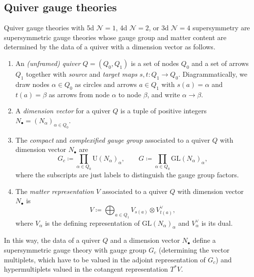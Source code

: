 \subsection{Quiver gauge theories}

Quiver gauge theories with 5d $\mathcal{N}=1$, 4d $\mathcal{N}=2$, or 3d $\mathcal{N}=4$ supersymmetry are supersymmetric gauge theories whose gauge group and matter content are determined by the data of a quiver with a dimension vector as follows.

\begin{definition}
	\begin{enumerate}[label=(\roman*)]
		\item An \emph{(unframed) quiver} $Q = (Q_0,Q_1)$ is a set of nodes $Q_0$ and a set of arrows $Q_1$ together with \emph{source} and \emph{target maps} $s,t\colon Q_1 \to Q_0$. Diagrammatically, we draw nodes $\alpha \in Q_0$ as circles and arrows $a \in Q_1$ with $s(a) = \alpha$ and $t(a) = \beta$ as arrows from node $\alpha$ to node $\beta$, and write $\alpha \to \beta$.
		\item A \emph{dimension vector} for a quiver $Q$ is a tuple of positive integers $N_\bullet = (N_\alpha)_{\alpha \in Q_0}$.
		\item The \emph{compact} and \emph{complexified gauge group} associated to a quiver $Q$ with dimension vector $N_\bullet$ are
		\begin{equation}
			G_c \coloneq \prod_{\alpha \in Q_0} \mathrm{U}(N_\alpha)_\alpha, \qquad G \coloneq \prod_{\alpha \in Q_0} \mathrm{GL}(N_\alpha)_\alpha,
		\end{equation}
		where the subscripts are just labels to distinguish the gauge group factors.
		\item The \emph{matter representation} $V$ associated to a quiver $Q$ with dimension vector $N_\bullet$ is
		\begin{equation}
			V \coloneq \bigoplus_{a \in Q_1} V_{s(a)} \otimes V_{t(a)}^\vee,
		\end{equation}
		where $V_\alpha$ is the defining representation of $\mathrm{GL}(N_\alpha)_\alpha$ and $V_\alpha^\vee$ is its dual.
	\end{enumerate}
\end{definition}

In this way, the data of a quiver $Q$ and a dimension vector $N_\bullet$ define a supersymmetric gauge theory with gauge group $G_c$ (determining the vector multiplets, which have to be valued in the adjoint representation of $G_c$) and hypermultiplets valued in the cotangent representation $T^* V$.

